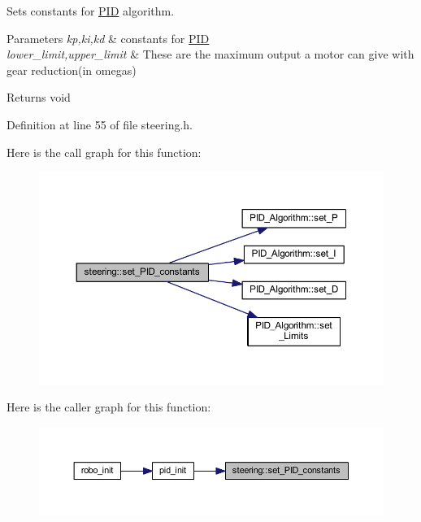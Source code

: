 Sets constants for \mbox{\hyperlink{class_p_i_d}{P\+ID}} algorithm. 


\begin{DoxyParams}{Parameters}
{\em kp,ki,kd} & constants for \mbox{\hyperlink{class_p_i_d}{P\+ID}} \\
\hline
{\em lower\+\_\+limit,upper\+\_\+limit} & These are the maximum output a motor can give with gear reduction(in omegas) \\
\hline
\end{DoxyParams}
\begin{DoxyReturn}{Returns}
void 
\end{DoxyReturn}


Definition at line 55 of file steering.\+h.

Here is the call graph for this function\+:
\nopagebreak
\begin{figure}[H]
\begin{center}
\leavevmode
\includegraphics[width=350pt]{classsteering_a6fb4cfdc9378336f78832351c4f6d181_cgraph}
\end{center}
\end{figure}
Here is the caller graph for this function\+:
\nopagebreak
\begin{figure}[H]
\begin{center}
\leavevmode
\includegraphics[width=350pt]{classsteering_a6fb4cfdc9378336f78832351c4f6d181_icgraph}
\end{center}
\end{figure}


